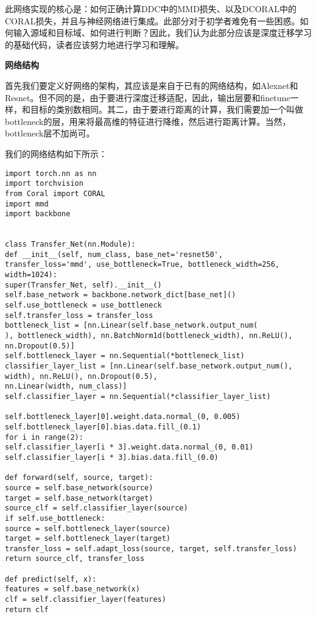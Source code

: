 此网络实现的核心是：如何正确计算DDC中的MMD损失、以及DCORAL中的CORAL损失，并且与神经网络进行集成。此部分对于初学者难免有一些困惑。如何输入源域和目标域、如何进行判断？因此，我们认为此部分应该是深度迁移学习的基础代码，读者应该努力地进行学习和理解。

\textbf{网络结构}

首先我们要定义好网络的架构，其应该是来自于已有的网络结构，如Alexnet和Resnet。但不同的是，由于要进行深度迁移适配，因此，输出层要和finetune一样，和目标的类别数相同。其二，由于要进行距离的计算，我们需要加一个叫做bottleneck的层，用来将最高维的特征进行降维，然后进行距离计算。当然，bottleneck层不加尚可。

我们的网络结构如下所示：

\begin{lstlisting}[title=深度迁移网络代码实现, frame=shadowbox]
import torch.nn as nn
import torchvision
from Coral import CORAL
import mmd
import backbone


class Transfer_Net(nn.Module):
def __init__(self, num_class, base_net='resnet50', transfer_loss='mmd', use_bottleneck=True, bottleneck_width=256, width=1024):
super(Transfer_Net, self).__init__()
self.base_network = backbone.network_dict[base_net]()
self.use_bottleneck = use_bottleneck
self.transfer_loss = transfer_loss
bottleneck_list = [nn.Linear(self.base_network.output_num(
), bottleneck_width), nn.BatchNorm1d(bottleneck_width), nn.ReLU(), nn.Dropout(0.5)]
self.bottleneck_layer = nn.Sequential(*bottleneck_list)
classifier_layer_list = [nn.Linear(self.base_network.output_num(), width), nn.ReLU(), nn.Dropout(0.5),
nn.Linear(width, num_class)]
self.classifier_layer = nn.Sequential(*classifier_layer_list)

self.bottleneck_layer[0].weight.data.normal_(0, 0.005)
self.bottleneck_layer[0].bias.data.fill_(0.1)
for i in range(2):
self.classifier_layer[i * 3].weight.data.normal_(0, 0.01)
self.classifier_layer[i * 3].bias.data.fill_(0.0)

def forward(self, source, target):
source = self.base_network(source)
target = self.base_network(target)
source_clf = self.classifier_layer(source)
if self.use_bottleneck:
source = self.bottleneck_layer(source)
target = self.bottleneck_layer(target)
transfer_loss = self.adapt_loss(source, target, self.transfer_loss)
return source_clf, transfer_loss

def predict(self, x):
features = self.base_network(x)
clf = self.classifier_layer(features)
return clf

\end{lstlisting}

